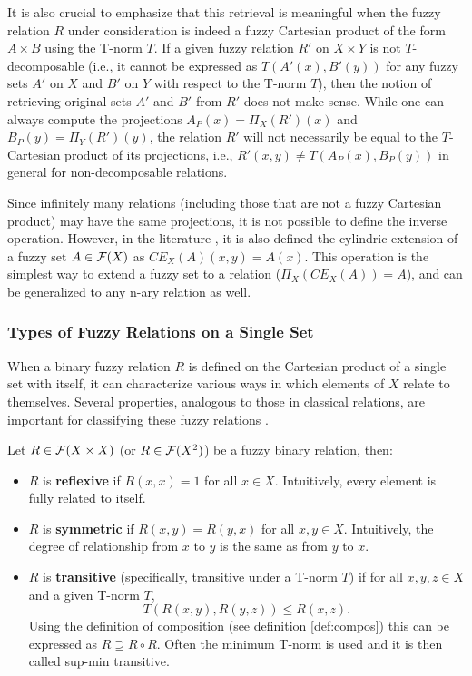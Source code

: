   \begin{remark}
  It is also crucial to emphasize that this retrieval is meaningful when the fuzzy relation $R$ under consideration is indeed a fuzzy Cartesian product of the form $A \times B$ using the T-norm $T$. If a given fuzzy relation $R'$ on $X \times Y$ is not $T$-decomposable (i.e., it cannot be expressed as $T(A'(x), B'(y))$ for any fuzzy sets $A'$ on $X$ and $B'$ on $Y$ with respect to the T-norm $T$), then the notion of retrieving original sets $A'$ and $B'$ from $R'$ does not make sense. While one can always compute the projections $A_P(x) = \Pi_X(R')(x)$ and $B_P(y) = \Pi_Y(R')(y)$, the relation $R'$ will not necessarily be equal to the $T$-Cartesian product of its projections, i.e., $R'(x,y) \neq T(A_P(x), B_P(y))$ in general for non-decomposable relations.
  \end{remark}


  Since infinitely many relations (including those that are not a fuzzy Cartesian product) may have the same projections, it is not possible to define the inverse operation. However, in the literature \cite[p.~61]{HistoryFL2017}, it is also defined the cylindric extension of a fuzzy set $A\in\mathcal{F}(X)$ as $CE_X(A)(x,y) = A(x)$. This operation is the simplest way to extend a fuzzy set to a relation ($\Pi_X(CE_X(A))=A$), and can be generalized to any n-ary relation as well.\\



\subsubsection*{Types of Fuzzy Relations on a Single Set}

When a binary fuzzy relation $R$ is defined on the Cartesian product of a single set with itself, it can characterize various ways in which elements of $X$ relate to themselves. Several properties, analogous to those in classical relations, are important for classifying these fuzzy relations \cite[p.~66]{HistoryFL2017}.

\begin{definition} Let $R \in \mathcal{F}(X \times X)$ (or $R \in \mathcal{F}(X^2)$) be a fuzzy binary relation, then:
  \begin{itemize}
    \item $R$ is \textbf{reflexive} if $R(x,x) = 1$ for all $x \in X$.
          Intuitively, every element is fully related to itself.
    \item $R$ is \textbf{symmetric} if $R(x,y) = R(y,x)$ for all $x,y \in X$.
          Intuitively, the degree of relationship from $x$ to $y$ is the same as from $y$ to $x$.
    \item $R$ is \textbf{transitive} (specifically, transitive under a T-norm $T$) if for all $x,y,z \in X$ and a given T-norm $T$,
          \[ T(R(x,y), R(y,z)) \le R(x,z). \]
          Using the definition of composition (see definition \ref{def:compos}) this can be expressed as $R \supseteq R \circ R$. Often the minimum T-norm is used and it is then called sup-min transitive.
  \end{itemize}
\end{definition}

